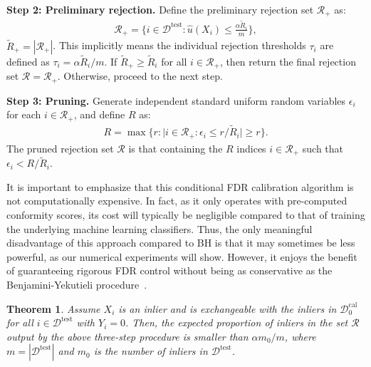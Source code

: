 \documentclass[11pt]{article}
\newtheorem{theorem}{Theorem}
\begin{document}
\textbf{Step 2: Preliminary rejection.} Define the preliminary rejection set $\mathcal{R}_+$ as:
\begin{align*}
    \mathcal{R}_+ = \bigg\{i \in \mathcal{D}^{\mathrm{test}}: \hat{u}(X_i) \leq \frac{\alpha\tilde{R}_i}{m}\bigg\},
\end{align*}
$\tilde{R}_+ = |\mathcal{R}_+|$. 
This implicitly means the individual rejection thresholds $\tau_i$ are defined as $\tau_i = \alpha\tilde{R}_i/m$.
If $\tilde{R}_+ \geq \tilde{R}_i$ for all $i \in \mathcal{R}_+$, then return the final rejection set $\mathcal{R} = \mathcal{R}_+$. Otherwise, proceed to the next step.


\textbf{Step 3: Pruning.} Generate independent standard uniform random variables $\epsilon_i$ for each $i \in \mathcal{R}_+$, and define $R$ as:
\begin{align*}
    R = \max \big\{r : \big| i \in \mathcal{R}_+: \epsilon_i \leq r/\tilde{R}_i \big| \geq r \big\}.
\end{align*}
The pruned rejection set $\mathcal{R}$ is that containing the $R$ indices $i \in \mathcal{R}_+$ such that $\epsilon_i < R / \tilde{R}_i$.

It is important to emphasize that this conditional FDR calibration algorithm is not computationally expensive. In fact, as it only operates with pre-computed conformity scores, its cost will typically be negligible compared to that of training the underlying machine learning classifiers.
Thus, the only meaningful disadvantage of this approach compared to BH is that it may sometimes be less powerful, as our numerical experiments will show. However, it enjoys the benefit of guaranteeing rigorous FDR control without being as conservative as the Benjamini-Yekutieli procedure~\cite{benjamini2001control}.

\begin{theorem} \label{theorem:fdr}
Assume $X_{i}$ is an inlier and is exchangeable with the inliers in $\mathcal{D}_0^{\mathrm{cal}}$ for all $i \in \mathcal{D}^{\mathrm{test}}$ with $Y_i=0$.
Then, the expected proportion of inliers in the set $\mathcal{R}$ output by the above three-step procedure is smaller than $\alpha m_0/m$, where $m = |\mathcal{D}^{\mathrm{test}}|$ and $m_0$ is the number of inliers in $\mathcal{D}^{\mathrm{test}}$.
\end{theorem}

\end{document}
